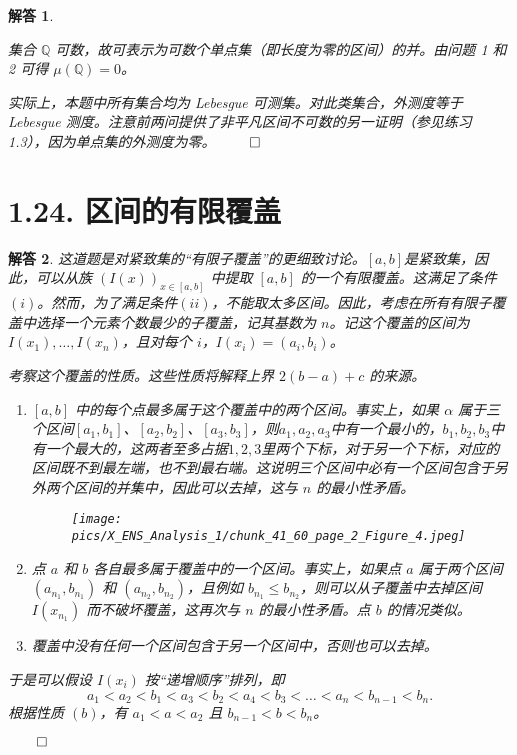 \documentclass[12pt,UTF8]{ctexbook}
\theoremstyle{exercisestyle}
\theoremstyle{solutionstyle}
\newtheorem*{solution*}{解答}
\newenvironment{solution}
  {\begin{solution*}}
  {\hfill\ensuremath{\qed}\end{solution*}}
\begin{document}
\begin{solution}
\begin{subquestions}
\item 集合 \(\mathbb{Q}\) 可数，故可表示为可数个单点集（即长度为零的区间）的并。由问题 1 和 2 可得 \(\mu(\mathbb{Q}) = 0\)。
\end{subquestions}
实际上，本题中所有集合均为 Lebesgue 可测集。对此类集合，外测度等于 Lebesgue 测度。注意前两问提供了非平凡区间不可数的另一证明（参见练习 1.3），因为单点集的外测度为零。
\end{solution}

\section{1.24. 区间的有限覆盖}
\begin{solution}
  这道题是对紧致集的“有限子覆盖”的更细致讨论。$[a, b]$是紧致集，因此，可以从族 \((I(x))_{x\in[a,b]}\) 中提取 \([a, b]\) 的一个有限覆盖。这满足了条件$(i)$。然而，为了满足条件$(ii)$，不能取太多区间。因此，考虑在所有有限子覆盖中选择一个元素个数最少的子覆盖，记其基数为 \(n\)。记这个覆盖的区间为 \(I(x_1), \ldots, I(x_n)\)，且对每个 \(i\)，\(I(x_i) = (a_i, b_i)\)。

考察这个覆盖的性质。这些性质将解释上界 \(2(b-a)+c\) 的来源。
\begin{enumerate}[label=(\textit{\alph*})]
  \item  \([a, b]\) 中的每个点最多属于这个覆盖中的两个区间。事实上，如果 \(\alpha\) 属于三个区间$[a_1, b_1]$、$[a_2, b_2]$、$[a_3, b_3]$，则$a_1, a_2, a_3$中有一个最小的，$b_1, b_2, b_3$中有一个最大的，这两者至多占据$1,2,3$里两个下标，对于另一个下标，对应的区间既不到最左端，也不到最右端。这说明三个区间中必有一个区间包含于另外两个区间的并集中，因此可以去掉，这与 \(n\) 的最小性矛盾。
  \begin{figure}[htbp]
    \centering
    \texttt{[image: pics/X\_ENS\_Analysis\_1/chunk\_41\_60\_page\_2\_Figure\_4.jpeg]}
  \end{figure}
  \item 点 \(a\) 和 \(b\) 各自最多属于覆盖中的一个区间。事实上，如果点 \(a\) 属于两个区间 \((a_{n_1}, b_{n_1})\) 和 \((a_{n_2}, b_{n_2})\)，且例如 \(b_{n_1} \leqslant b_{n_2}\)，则可以从子覆盖中去掉区间 \(I(x_{n_1})\) 而不破坏覆盖，这再次与 \(n\) 的最小性矛盾。点 \(b\) 的情况类似。
  \item 覆盖中没有任何一个区间包含于另一个区间中，否则也可以去掉。
\end{enumerate}

于是可以假设 \(I(x_i)\) 按“递增顺序”排列，即
\[
a_1 < a_2 < b_1 < a_3 < b_2 < a_4 < b_3 < \dots < a_n < b_{n-1} < b_n.
\]
根据性质 $(b)$，有 \(a_1 < a < a_2\) 且 \(b_{n-1} < b < b_n\)。


\end{solution}
\end{document}
